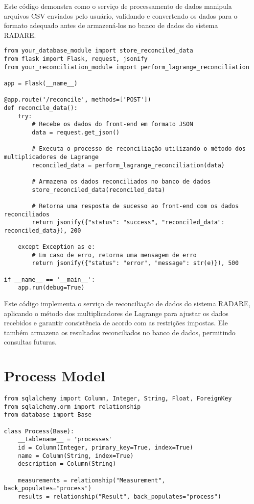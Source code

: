 Este código demonstra como o serviço de processamento de dados manipula arquivos CSV enviados pelo usuário, validando e convertendo os dados para o formato adequado antes de armazená-los no banco de dados do sistema RADARE.

\label{Anexo:CodigoReconciliacaoDados}

\begin{verbatim}
from your_database_module import store_reconciled_data
from flask import Flask, request, jsonify
from your_reconciliation_module import perform_lagrange_reconciliation

app = Flask(__name__)

@app.route('/reconcile', methods=['POST'])
def reconcile_data():
    try:
        # Recebe os dados do front-end em formato JSON
        data = request.get_json()

        # Executa o processo de reconciliação utilizando o método dos multiplicadores de Lagrange
        reconciled_data = perform_lagrange_reconciliation(data)

        # Armazena os dados reconciliados no banco de dados
        store_reconciled_data(reconciled_data)

        # Retorna uma resposta de sucesso ao front-end com os dados reconciliados
        return jsonify({"status": "success", "reconciled_data": reconciled_data}), 200

    except Exception as e:
        # Em caso de erro, retorna uma mensagem de erro
        return jsonify({"status": "error", "message": str(e)}), 500

if __name__ == '__main__':
    app.run(debug=True)
\end{verbatim}

Este código implementa o serviço de reconciliação de dados do sistema RADARE, aplicando o método dos multiplicadores de Lagrange para ajustar os dados recebidos e garantir consistência de acordo com as restrições impostas. Ele também armazena os resultados reconciliados no banco de dados, permitindo consultas futuras.

\label{Anexo:CodigoModelo}

\section*{Process Model}
\begin{verbatim}
from sqlalchemy import Column, Integer, String, Float, ForeignKey
from sqlalchemy.orm import relationship
from database import Base

class Process(Base):
    __tablename__ = 'processes'
    id = Column(Integer, primary_key=True, index=True)
    name = Column(String, index=True)
    description = Column(String)

    measurements = relationship("Measurement", back_populates="process")
    results = relationship("Result", back_populates="process")
\end{verbatim}


